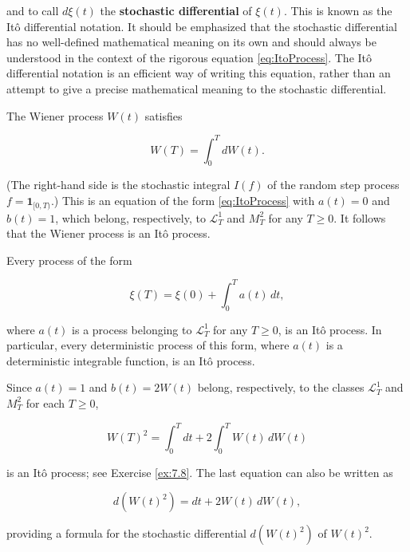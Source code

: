 and to call $d\xi(t)$ the \textbf{stochastic differential} of $\xi(t)$. This is known as the Itô differential notation. It should be emphasized that the stochastic differential has no well-defined mathematical meaning on its own and should always be understood in the context of the rigorous equation \eqref{eq:ItoProcess}. The Itô differential notation is an efficient way of writing this equation, rather than an attempt to give a precise mathematical meaning to the stochastic differential.

\begin{Example}
\label{ex:7-wiener-ito}
The Wiener process $W(t)$ satisfies

\begin{equation}
W(T) = \int_0^T dW(t).
\end{equation}

(The right-hand side is the stochastic integral $I(f)$ of the random step process $f = \mathbf{1}_{[0,T)}$.) This is an equation of the form \eqref{eq:ItoProcess} with $a(t) = 0$ and $b(t) = 1$, which belong, respectively, to $\mathcal{L}_T^1$ and $M_T^2$ for any $T \geq 0$. It follows that the Wiener process is an Itô process.
\end{Example}

\begin{Example}
\label{ex:7-deterministic-ito}
Every process of the form

\begin{equation}
\xi(T) = \xi(0) + \int_0^T a(t) \, dt,
\end{equation}

where $a(t)$ is a process belonging to $\mathcal{L}_T^1$ for any $T \geq 0$, is an Itô process. In particular, every deterministic process of this form, where $a(t)$ is a deterministic integrable function, is an Itô process.
\end{Example}

\begin{Example}
\label{ex:7-wiener-square-ito}
Since $a(t) = 1$ and $b(t) = 2W(t)$ belong, respectively, to the classes $\mathcal{L}_T^1$ and $M_T^2$ for each $T \geq 0$,

\begin{equation}
W(T)^2 = \int_0^T dt + 2 \int_0^T W(t) \, dW(t)
\end{equation}

is an Itô process; see Exercise \ref{ex:7.8}. The last equation can also be written as

\begin{equation}
d\left(W(t)^2\right) = dt + 2W(t) \, dW(t),
\end{equation}

providing a formula for the stochastic differential $d(W(t)^2)$ of $W(t)^2$.
\end{Example}

